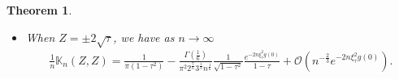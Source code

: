 \documentclass[%
 jmp,
cp,  %
 amsmath,amsthm,amssymb,%
 reprint,%
onecolumn]{revtex4-2}
\newtheorem{theorem}{Theorem}[section]
\begin{document}
\begin{theorem}
\begin{itemize}
\begin{align*}
\begin{cases}
\end{cases}
\end{align*}
\item[(iii)] When $Z = \pm 2\sqrt\tau$, we have as $n\to\infty$
\begin{align*}
\frac{1}{n} \mathbb K_n(Z, Z) 
= \frac{1}{\pi (1-\tau^2)}  
-\frac{\Gamma\left(\frac{1}{6}\right)}{\pi^2 2^\frac{7}{6} 3^\frac{1}{3}
n^\frac{1}{6}} \frac{1}{\sqrt{1-\tau^2}} \frac{e^{- 2n \xi_\tau^2 g(0)}}{1-\tau}
+ \mathcal O\left(n^{-\frac{2}{3}} e^{- 2n \xi_\tau^2 g(0)}\right).
\end{align*}
\end{itemize}
\end{theorem}
\end{document}
